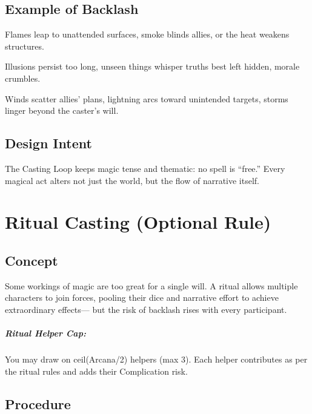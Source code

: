 \documentclass[12pt]{book}
\begin{document}
\section{Example of Backlash}
\begin{description}[leftmargin=2cm]
  \item[Fire] Flames leap to unattended surfaces, smoke blinds allies, or the heat weakens structures.  
  \item[Shadow] Illusions persist too long, unseen things whisper truths best left hidden, morale crumbles.  
  \item[Storm] Winds scatter allies’ plans, lightning arcs toward unintended targets, storms linger beyond the caster’s will.  
\end{description}

\section{Design Intent}
The Casting Loop keeps magic tense and thematic: no spell is “free.”  
Every magical act alters not just the world, but the flow of narrative itself.

\chapter{Ritual Casting (Optional Rule)}

\section*{Concept}
Some workings of magic are too great for a single will. 
A ritual allows multiple characters to join forces, pooling their dice and narrative effort to achieve extraordinary effects—
but the risk of backlash rises with every participant.  

\paragraph{Ritual Helper Cap:} 
You may draw on ceil(Arcana/2) helpers (max 3).
Each helper contributes as per the ritual rules and adds their Complication risk.

\section*{Procedure}
\end{document}
